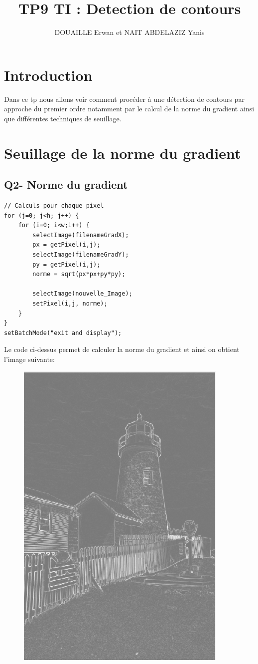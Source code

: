 \documentclass[a4paper,12pt]{report}
\title{TP9 TI : Detection de contours}
\author{DOUAILLE Erwan et NAIT ABDELAZIZ Yanis}
\begin{document}
\maketitle
\section*{Introduction}
Dans ce tp nous allons voir comment procéder à une détection de contours par approche du premier ordre notamment par le calcul de la norme du gradient ainsi que différentes techniques de seuillage.

\section*{Seuillage de la norme du gradient}
\subsection*{Q2- Norme du gradient}
\begin{lstlisting}
// Calculs pour chaque pixel
for (j=0; j<h; j++) {
	for (i=0; i<w;i++) {
		selectImage(filenameGradX);
		px = getPixel(i,j);
		selectImage(filenameGradY);
		py = getPixel(i,j);
		norme = sqrt(px*px+py*py);

		selectImage(nouvelle_Image);
		setPixel(i,j, norme);	
	}
}
setBatchMode("exit and display");
\end{lstlisting}
Le code ci-dessus permet de calculer la norme du gradient et ainsi on obtient l'image suivante:
\begin{figure}[!ht]
	\center
	\includegraphics[scale=0.3]{./imageResultats/gradient_q2.png}
\end{figure}
\end{document}

